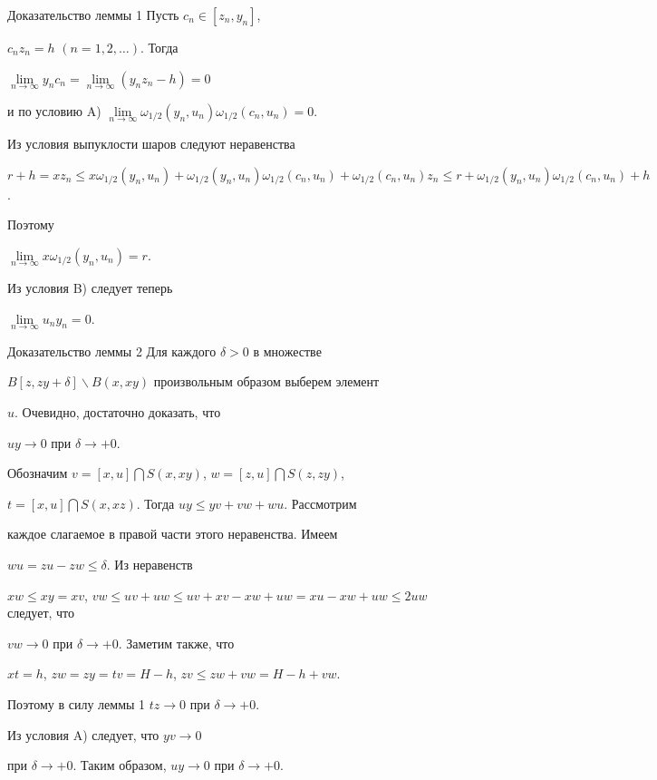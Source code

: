 




\begin{pf*}{Доказательство леммы 1} Пусть $c_{n} \in [z_{n},y_{n}]$,


$c_{n}z_{n} = h$ $(n = 1,2,\dotsc)$. Тогда 


$\lim\limits_{n\to\infty}{y_{n}c_{n}}=\lim\limits_{n\to\infty}


{(y_{n}z_{n} -h)} = 0$ 


и по условию A) $\lim\limits_{n \to \infty}


{\omega_{1/2}(y_{n},u_{n})\omega_{1/2}(c_{n},u_{n})} = 0$. 


Из условия выпуклости шаров следуют неравенства


$r + h = xz_{n} \le x\omega_{1/2}(y_{n},u_{n}) +


\omega_{1/2}(y_{n},u_{n})\omega_{1/2}(c_{n},u_{n}) +


\omega_{1/2}(c_{n},u_{n})z_{n} \le r +


\omega_{1/2}(y_{n},u_{n})\omega_{1/2}(c_{n},u_{n}) + h$.


Поэтому 


$\lim\limits_{n \to \infty}{x\omega_{1/2}(y_{n},u_{n})} = r$.


Из условия B) следует теперь


$\lim\limits_{n \to \infty}{u_{n}y_{n}} = 0$.


\end{pf*}





\begin{pf*}{Доказательство леммы 2} Для каждого $\delta>0$ в множестве


$B[z,zy + \delta]\backslash B(x,xy)$ произвольным образом выберем элемент


$u$. Очевидно, достаточно доказать, что


$uy\to 0$ при $\delta\to+0$.


Обозначим $v = [x,u]\bigcap S(x,xy)$, $w = [z,u]\bigcap S(z,zy)$,


$t = [x,u]\bigcap S(x,xz)$. Тогда $uy \le yv + vw + wu$. Рассмотрим


каждое слагаемое в правой части этого неравенства. Имеем 


$wu = zu - zw \le \delta$. Из неравенств


$xw\le xy=xv$, $vw\le uv+uw\le uv+xv-xw+uw=xu-xw+uw\le 2uw$ следует, что


$vw\to 0$ при $\delta\to+0$. Заметим также, что


$xt=h$, $zw=zy=tv=H-h$, $zv\le zw+vw=H-h+vw$.


Поэтому в силу леммы 1\; $tz\to 0$ при $\delta\to+0$.


Из условия A) следует, что $yv\to 0$


при $\delta\to+0$. Таким образом, $uy\to 0$ при $\delta\to+0$.


\end{pf*}





